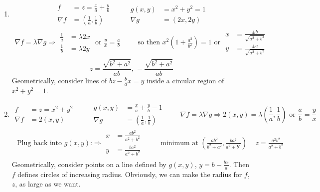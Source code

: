 \documentclass[twoside]{amsart}
\theoremstyle{plain}
\theoremstyle{definition}
\begin{document}
\begin{enumerate}
\item \[
\begin{aligned}
  f & = z = \frac{x}{a} + \frac{y}{b} \\ 
  \nabla f & = \left( \frac{1}{a}, \frac{1}{b} \right) 
\end{aligned}  \quad \quad \, \begin{aligned} g(x,y) & = x^2 + y^2 = 1 \\ \nabla g & = (2x, 2y) \end{aligned}
\]
\[
\begin{gathered}
  \nabla f = \lambda \nabla g \Longrightarrow \begin{aligned} \frac{1}{a} & = \lambda 2x \\ \frac{1}{b} & = \lambda 2y \end{aligned} \text{ or } \frac{y}{x} = \frac{a}{b} \quad \quad \,  
 \text{ so then } x^2 \left( 1 + \frac{a^2}{b^2} \right) = 1 \text{ or } \begin{aligned} x & = \frac{ \pm b }{ \sqrt{ a^2 + b^2 }} \\ y & = \frac{ \pm a }{ \sqrt{ a^2 +b^2 } } \end{aligned} 
\end{gathered}
\]
\[
\boxed{ z = \frac{ \sqrt{ b^2 + a^2 }}{ ab} , \, - \frac{ \sqrt{ b^2 + a^2 }}{ab}  }
\]
Geometrically, consider lines of $bz - \frac{b}{a} x = y$ inside a circular region of $x^2 + y^2 =1$.  
\item \[
 \begin{aligned}
   f & = z = x^2 + y^2 \\ 
   \nabla f & = 2 (x,y) 
 \end{aligned} \quad \quad \, \begin{aligned} g(x,y) & = \frac{x}{a} + \frac{y}{b} -1 \\ \nabla g & = \left( \frac{1}{a}, \frac{1}{b} \right) \end{aligned} \quad \quad \,
  \nabla f = \lambda \nabla g \Longrightarrow 2(x,y) = \lambda \left( \frac{1}{a}, \frac{1}{b} \right)  \text{ or } \frac{a}{b} = \frac{y}{x} 
\]
\[
\begin{gathered}
  \text{ Plug back into $g(x,y)$:} \Longrightarrow \begin{aligned} x & = \frac{ ab^2 }{ a^2 + b^2 } \\ y & = \frac{ ba^2}{a^2 + b^2 } \end{aligned} 
\quad \quad \,   \text{ minimum at } \left( \frac{ ab^2}{b^2 + a^2}, \frac{ ba^2 }{ a^2 + b^2 } \right) \quad \, z = \frac{ a^2 b^2 }{ a^2 + b^2 }
\end{gathered}
\]
Geometrically, consider points on a line defined by $g(x,y)$, $y = b - \frac{bx}{a}$.  Then $f$ defines circles of increasing radius.  Obviously, we can make the radius for $f$, $z$, as large as we want.  
\end{enumerate} 
\end{document}
